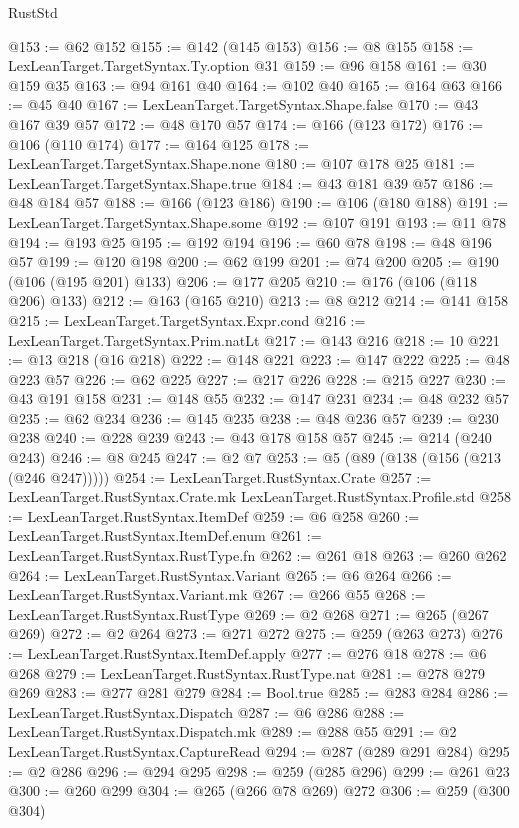 \begin{lexlean}{RustStd}
\begin{coremodule}
@153 := @62 @152
@155 := @142 (@145 @153)
@156 := @8 @155
@158 := LexLeanTarget.TargetSyntax.Ty.option @31
@159 := @96 @158
@161 := @30 @159 @35
@163 := @94 @161 @40
@164 := @102 @40
@165 := @164 @63
@166 := @45 @40
@167 := LexLeanTarget.TargetSyntax.Shape.false
@170 := @43 @167 @39 @57
@172 := @48 @170 @57
@174 := @166 (@123 @172)
@176 := @106 (@110 @174)
@177 := @164 @125
@178 := LexLeanTarget.TargetSyntax.Shape.none
@180 := @107 @178 @25
@181 := LexLeanTarget.TargetSyntax.Shape.true
@184 := @43 @181 @39 @57
@186 := @48 @184 @57
@188 := @166 (@123 @186)
@190 := @106 (@180 @188)
@191 := LexLeanTarget.TargetSyntax.Shape.some
@192 := @107 @191
@193 := @11 @78
@194 := @193 @25
@195 := @192 @194
@196 := @60 @78
@198 := @48 @196 @57
@199 := @120 @198
@200 := @62 @199
@201 := @74 @200
@205 := @190 (@106 (@195 @201) @133)
@206 := @177 @205
@210 := @176 (@106 (@118 @206) @133)
@212 := @163 (@165 @210)
@213 := @8 @212
@214 := @141 @158
@215 := LexLeanTarget.TargetSyntax.Expr.cond
@216 := LexLeanTarget.TargetSyntax.Prim.natLt
@217 := @143 @216
@218 := 10
@221 := @13 @218 (@16 @218)
@222 := @148 @221
@223 := @147 @222
@225 := @48 @223 @57
@226 := @62 @225
@227 := @217 @226
@228 := @215 @227
@230 := @43 @191 @158
@231 := @148 @55
@232 := @147 @231
@234 := @48 @232 @57
@235 := @62 @234
@236 := @145 @235
@238 := @48 @236 @57
@239 := @230 @238
@240 := @228 @239
@243 := @43 @178 @158 @57
@245 := @214 (@240 @243)
@246 := @8 @245
@247 := @2 @7
@253 := @5 (@89 (@138 (@156 (@213 (@246 @247)))))
@254 := LexLeanTarget.RustSyntax.Crate
@257 := LexLeanTarget.RustSyntax.Crate.mk LexLeanTarget.RustSyntax.Profile.std
@258 := LexLeanTarget.RustSyntax.ItemDef
@259 := @6 @258
@260 := LexLeanTarget.RustSyntax.ItemDef.enum
@261 := LexLeanTarget.RustSyntax.RustType.fn
@262 := @261 @18
@263 := @260 @262
@264 := LexLeanTarget.RustSyntax.Variant
@265 := @6 @264
@266 := LexLeanTarget.RustSyntax.Variant.mk
@267 := @266 @55
@268 := LexLeanTarget.RustSyntax.RustType
@269 := @2 @268
@271 := @265 (@267 @269)
@272 := @2 @264
@273 := @271 @272
@275 := @259 (@263 @273)
@276 := LexLeanTarget.RustSyntax.ItemDef.apply
@277 := @276 @18
@278 := @6 @268
@279 := LexLeanTarget.RustSyntax.RustType.nat
@281 := @278 @279 @269
@283 := @277 @281 @279
@284 := Bool.true
@285 := @283 @284
@286 := LexLeanTarget.RustSyntax.Dispatch
@287 := @6 @286
@288 := LexLeanTarget.RustSyntax.Dispatch.mk
@289 := @288 @55
@291 := @2 LexLeanTarget.RustSyntax.CaptureRead
@294 := @287 (@289 @291 @284)
@295 := @2 @286
@296 := @294 @295
@298 := @259 (@285 @296)
@299 := @261 @23
@300 := @260 @299
@304 := @265 (@266 @78 @269) @272
@306 := @259 (@300 @304)

\end{coremodule}
\end{lexlean}
